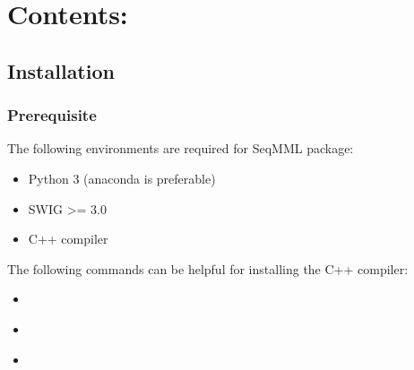 \documentclass[letterpaper,10pt,english]{sphinxmanual}
\begin{document}
\chapter{Contents:}
\label{\detokenize{index:contents}}

\section{Installation}
\label{\detokenize{installation:installation}}\label{\detokenize{installation::doc}}

\subsection{Prerequisite}
\label{\detokenize{installation:prerequisite}}
The following environments are required for SeqMML package:
\begin{itemize}
\item {} 
Python 3 (anaconda is preferable)

\item {} 
SWIG \textgreater{}= 3.0

\item {} 
C++ compiler

\end{itemize}

The following commands can be helpful for installing the C++ compiler:
\begin{itemize}
\item {} 

\end{itemize}

\begin{sphinxVerbatim}[commandchars=\\\{\}]
    
\end{sphinxVerbatim}
\begin{itemize}
\item {} 

\end{itemize}

\begin{sphinxVerbatim}[commandchars=\\\{\}]
 
\end{sphinxVerbatim}
\begin{itemize}
\item {} 

\end{itemize}
\end{document}
